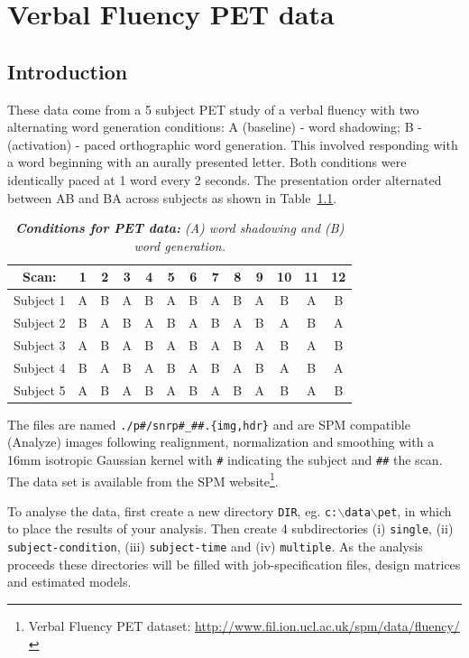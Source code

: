\chapter{Verbal Fluency PET data \label{Chap:data:pet}}

\section{Introduction}

These data come from a 5 subject PET study of a verbal fluency with two alternating word generation conditions: A (baseline) - word shadowing; B - (activation) - paced orthographic word generation. This involved responding with a word beginning with an aurally presented letter. Both conditions were identically paced at 1 word every 2 seconds. The presentation order alternated between AB and BA across subjects as shown in Table~\ref{conditions}.

\begin{table}[h]
\begin{center}
\begin{tabular}{ccccccccccccc}
  Scan: & 1 & 2 & 3 & 4 & 5 & 6 & 7 & 8 & 9 & 10 & 11 & 12 \\  \hline
  Subject 1& A & B & A & B& A & B& A & B& A & B& A & B \\
  Subject 2& B & A & B& A & B& A & B& A & B& A & B & A \\
  Subject 3& A & B & A & B& A & B& A & B& A & B& A & B \\
  Subject 4& B & A & B& A & B& A & B& A & B& A & B & A \\
  Subject 5& A & B & A & B& A & B& A & B& A & B& A & B \\ \hline
\end{tabular}
\end{center}
\caption{\em \textbf{Conditions for PET data:} (A) word shadowing and (B) word generation. \label{conditions}}
\end{table}

The files are named \verb!./p#/snrp#_##.{img,hdr}! and are SPM compatible (Analyze) images following realignment, normalization and smoothing with a 16mm isotropic Gaussian kernel with \verb!#! indicating the subject and \verb!##! the scan. The data set is available from the SPM website\footnote{Verbal Fluency PET dataset: \url{http://www.fil.ion.ucl.ac.uk/spm/data/fluency/}}.

To analyse the data, first create a new directory \texttt{DIR}, eg. \texttt{c:$\backslash$data$\backslash$pet}, in which to place the results of your analysis. Then create 4 subdirectories (i) \texttt{single}, (ii) \texttt{subject-condition}, (iii) \texttt{subject-time} and (iv) \texttt{multiple}.
As the analysis proceeds these directories will be filled with job-specification files, design matrices and estimated models.

